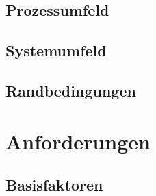 \documentclass[11pt,titelpage]{scrreprt}
\begin{document}
\subsection{Prozessumfeld}
\subsection{Systemumfeld}
\subsection{Randbedingungen}
\section{Anforderungen}
\subsection{Basisfaktoren}
\end{document}
